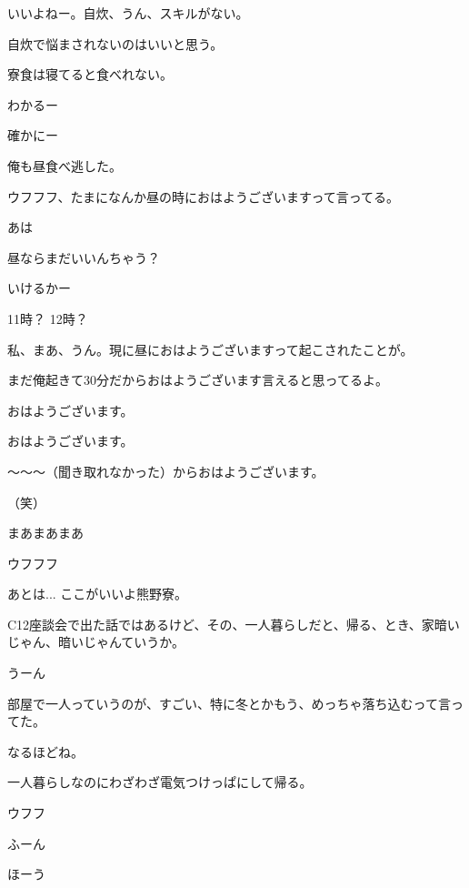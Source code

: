 \begin{multicols}{3}
{        いいよねー。自炊、うん、スキルがない。

        自炊で悩まされないのはいいと思う。

        寮食は寝てると食べれない。

        わかるー

        確かにー

        俺も昼食べ逃した。

        ウフフフ、たまになんか昼の時におはようございますって言ってる。

        あは

        昼ならまだいいんちゃう？

        いけるかー

        11時？ 12時？

        私、まあ、うん。現に昼におはようございますって起こされたことが。

        まだ俺起きて30分だからおはようございます言えると思ってるよ。

        おはようございます。

        おはようございます。

        ～～～（聞き取れなかった）からおはようございます。

        （笑）

        まあまあまあ

        ウフフフ

        あとは... ここがいいよ熊野寮。

        C12座談会で出た話ではあるけど、その、一人暮らしだと、帰る、とき、家暗いじゃん、暗いじゃんていうか。

        うーん

        部屋で一人っていうのが、すごい、特に冬とかもう、めっちゃ落ち込むって言ってた。

        なるほどね。

        一人暮らしなのにわざわざ電気つけっぱにして帰る。

        ウフフ

        ふーん

        ほーう

}
\end{multicols}
